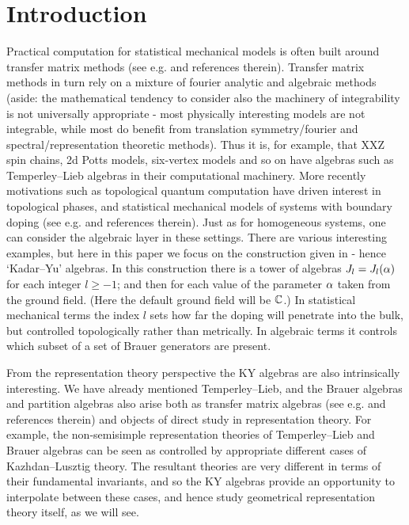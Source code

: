 

\section{Introduction}   \label{ss:intro}

Practical computation for statistical mechanical models is often built around transfer matrix methods (see e.g. \cite{Baxter81,Baxter83,LiebMattis,Martin91,Wannier,Brown67} %
and references therein). 
Transfer matrix methods in turn rely on a mixture of fourier analytic and algebraic methods (aside: the mathematical tendency to consider also the machinery of integrability is not 
universally  %
appropriate  %
- most physically interesting models are not integrable, while most do benefit from translation symmetry/fourier and spectral/representation theoretic methods). 
Thus it is, for example, that XXZ spin chains, 2d Potts models, six-vertex models and so on have algebras such as Temperley--Lieb algebras \cite{TemperleyLieb71} in their computational machinery. 
More recently motivations such as topological quantum computation have driven interest in topological phases, and statistical mechanical models of systems with boundary doping 
(see e.g. \cite{Fradkin,GuidrySun} and references therein).  
Just as for homogeneous systems, one can consider the algebraic layer in these settings. There are various interesting examples, but here 
in this paper 
we focus on the construction given in \cite{KadarYu} - hence `Kadar--Yu' algebras. 
In this construction there is a tower of algebras $J_l = J_l(\alpha)$ for each integer $l \geq -1$;
and then for each value of the parameter $\alpha$ taken from the ground field. 
(Here the default ground field will be $\mathbb{C}$.) 
In statistical mechanical terms the index $l$ sets how far the doping will penetrate into the bulk, but controlled topologically rather than metrically. In algebraic terms it controls which subset of a set of Brauer generators are present.

From the representation theory perspective the KY algebras are also intrinsically interesting. We have already mentioned Temperley--Lieb, and the Brauer algebras \cite{Brauer} and partition algebras \cite{Martin91} also arise both as transfer matrix algebras 
(see e.g. \cite{Gainutdinov_2014,Ramgoolam07,Ramgoolam} and references therein)
and objects of direct study in representation theory. 
For example, the non-semisimple representation theories of Temperley--Lieb and Brauer algebras can be seen as controlled by appropriate different cases of Kazhdan--Lusztig theory. The resultant theories are very different in terms of their fundamental invariants, and so the KY algebras provide an opportunity to interpolate between these cases, and hence 
study  %
geometrical representation theory itself, as we will see. 

